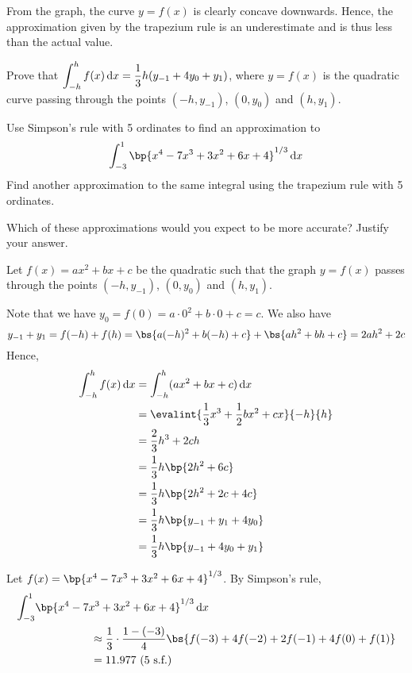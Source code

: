 \documentclass{echw}
\begin{document}
            From the graph, the curve $y = f(x)$ is clearly concave downwards. Hence, the approximation given by the trapezium rule is an underestimate and is thus less than the actual value.

    \problem{}
        Prove that $\displaystyle\int_{-h}^h f(x) \mathop{\mathrm{d}x} = \dfrac13 h (y_{-1} + 4y_0 + y_1)$, where $y = f(x)$ is the quadratic curve passing through the points $(-h, y_{-1})$, $(0, y_0)$ and $(h, y_1)$.

        Use Simpson's rule with 5 ordinates to find an approximation to \[\int_{-3}^1 \bp{x^4 - 7x^3 + 3x^2 + 6x + 4}^{1/3} \d x\] Find another approximation to the same integral using the trapezium rule with 5 ordinates.

        Which of these approximations would you expect to be more accurate? Justify your answer.

    \solution
        Let $f(x) = ax^2 + bx + c$ be the quadratic such that the graph $y = f(x)$ passes through the points $(-h, y_{-1})$, $(0, y_0)$ and $(h, y_1)$.

        Note that we have $y_0 = f(0) = a \cdot 0^2 + b \cdot 0 + c = c$. We also have 
        \[
            y_{-1} + y_1 = f(-h) + f(h) = \bs{a(-h)^2 + b(-h) + c} + \bs{ah^2 + bh + c} = 2ah^2 + 2c
        \] Hence,
        \begin{align*}
            \int_{-h}^h f(x) \d x &= \int_{-h}^h (ax^2 + bx + c) \d x\\
            &= \evalint{\dfrac13 x^3 + \dfrac12 bx^2 + cx}{-h}{h}\\
            &= \dfrac23 h^3 + 2ch\\
            &= \dfrac13 h \bp{2h^2 + 6c}\\
            &= \dfrac13 h \bp{2h^2 + 2c + 4c}\\
            &= \dfrac13 h \bp{y_{-1} + y_1 + 4y_0}\\
            &= \dfrac13 h \bp{y_{-1} + 4y_0 + y_1}
        \end{align*}

        \dash

        Let $f(x) = \bp{x^4 - 7x^3 + 3x^2 + 6x + 4}^{1/3}$. By Simpson's rule,
        \begin{align*}
            \int_{-3}^1 &\bp{x^4 - 7x^3 + 3x^2 + 6x + 4}^{1/3} \d x\\
            &\hspace{5em}\approx \dfrac13 \cdot \dfrac{1-(-3)}{4} \bs{f(-3) + 4f(-2) + 2f(-1) + 4f(0) + f(1)}\\
            &\hspace{5em}= 11.977 \tosf{5}
        \end{align*}
\end{document}
